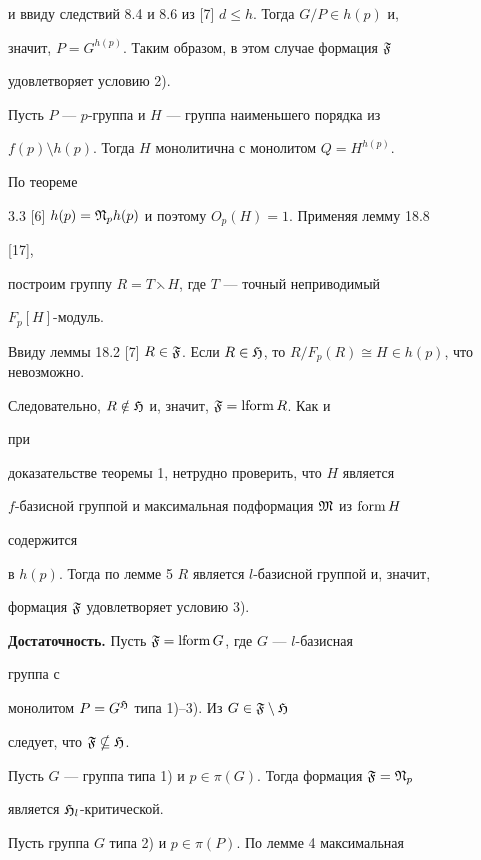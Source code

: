\begin{pf}
и ввиду следствий 8.4 и 8.6 из [7] $d\le h$. Тогда $G/P\in h(p)$ и, 


значит, $P=G^{h(p)}$. Таким образом, в этом случае формация $\frak F$ 


удовлетворяет условию 2). 


 


Пусть $P$ --- $p$-группа и $H$ --- группа наименьшего порядка из 


$f(p)\setminus h(p)$. Тогда $H$ монолитична с монолитом $Q=H^{h(p)}$. 


По теореме 


3.3 [6] $h(p)=\frak N_p h(p)$ и поэтому $O_p(H)=1$. Применяя лемму 18.8 


[17], 


построим группу $R=T\leftthreetimes H$, где $T$ --- точный неприводимый 


$F_p[H]$-модуль. 


Ввиду леммы 18.2 [7] $R\in\frak F$. Если $R\in\frak H$, то $R/F_p(R)\cong 


H\in h(p)$, что невозможно. 


Следовательно, $R\notin\frak H$ и, значит, $\frak F=\operatorname{lform} R$. Как и 


при 


доказательстве теоремы 1, нетрудно проверить, что $H$ является 


$f$-базисной группой и максимальная подформация $\frak M$ из $\operatorname{form} H$ 


содержится 


в $h(p)$. Тогда по лемме 5 $R$ является $l$-базисной группой и, значит, 


формация $\frak F$ удовлетворяет условию 3). 


\smallskip 


 


{\bf Достаточность.} Пусть $\frak F=\operatorname{lform} G$, где $G$ --- $l$-базисная 


группа с 


монолитом $P=G^{\frak H}$ типа 1)--3). Из $G\in\frak F\setminus\frak H$ 


следует, что $\frak F\nsubseteq\frak H$. 


Пусть $G$ --- группа типа 1) и $p\in\pi(G)$. Тогда формация $\frak 


F=\frak N_p$ 


является $\frak H_l$-критической. 


Пусть группа $G$ типа 2) и $p\in\pi(P)$. По лемме 4 максимальная 



\end{pf}
